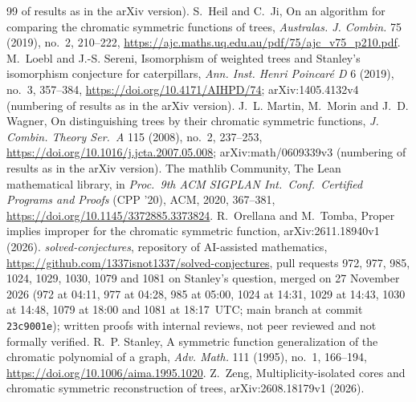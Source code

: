 \documentclass[11pt]{article}
\theoremstyle{definition}
\theoremstyle{remark}
\begin{document}
{\begin{thebibliography}{99}
of results as in the arXiv version).
 S.~Heil and C.~Ji, On an algorithm for comparing the chromatic
symmetric functions of trees, \emph{Australas. J. Combin.} 75 (2019), no.~2,
210--222, \url{https://ajc.maths.uq.edu.au/pdf/75/ajc_v75_p210.pdf}.
 M.~Loebl and J.-S. Sereni, Isomorphism of weighted trees and
Stanley's isomorphism conjecture for caterpillars, \emph{Ann. Inst. Henri
Poincar\'e D} 6 (2019), no.~3, 357--384, \url{https://doi.org/10.4171/AIHPD/74};
arXiv:1405.4132v4 (numbering of results as in the arXiv version).
 J.~L. Martin, M.~Morin and J.~D. Wagner, On distinguishing trees by
their chromatic symmetric functions, \emph{J. Combin. Theory Ser.~A} 115 (2008),
no.~2, 237--253, \url{https://doi.org/10.1016/j.jcta.2007.05.008};
arXiv:math/0609339v3 (numbering of results as in the arXiv version).
The mathlib Community, The Lean mathematical library, in \emph{Proc.\ 9th ACM
SIGPLAN Int.\ Conf.\ Certified Programs and Proofs} (CPP '20), ACM, 2020,
367--381, \url{https://doi.org/10.1145/3372885.3373824}.
 R.~Orellana and M.~Tomba, Proper implies improper for the chromatic
symmetric function, arXiv:2611.18940v1 (2026).
 \emph{solved-conjectures}, repository of AI-assisted mathematics,
\url{https://github.com/1337isnot1337/solved-conjectures}, pull requests 972,
977, 985, 1024, 1029, 1030, 1079 and 1081 on Stanley's question, merged on 27
November 2026 (972 at 04:11, 977 at 04:28, 985 at 05:00, 1024 at 14:31, 1029 at
14:43, 1030 at 14:48, 1079 at 18:00 and 1081 at 18:17~UTC; main branch at commit
\texttt{23c9001e}); written proofs with internal reviews, not peer reviewed and
not formally verified.
 R.~P. Stanley, A symmetric function generalization of the
chromatic polynomial of a graph, \emph{Adv. Math.} 111 (1995), no.~1, 166--194,
\url{https://doi.org/10.1006/aima.1995.1020}.
 Z.~Zeng, Multiplicity-isolated cores and chromatic symmetric
reconstruction of trees, arXiv:2608.18179v1 (2026).
\end{thebibliography}}
\end{document}
